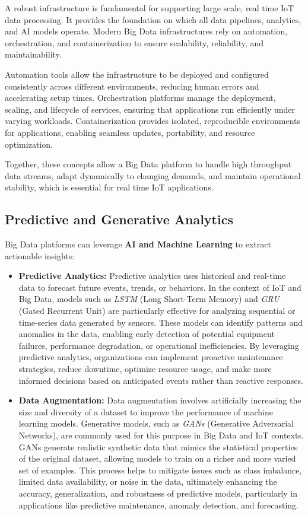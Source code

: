 A robust infrastructure is fundamental for supporting large scale, real time IoT data processing. It provides the foundation on which all data pipelines, analytics, and AI models operate. Modern Big Data infrastructures rely on automation, orchestration, and containerization to ensure scalability, reliability, and maintainability.

Automation tools allow the infrastructure to be deployed and configured consistently across different environments, reducing human errors and accelerating setup times. Orchestration platforms manage the deployment, scaling, and lifecycle of services, ensuring that applications run efficiently under varying workloads. Containerization provides isolated, reproducible environments for applications, enabling seamless updates, portability, and resource optimization.

Together, these concepts allow a Big Data platform to handle high throughput data streams, adapt dynamically to changing demands, and maintain operational stability, which is essential for real time IoT applications.


\subsection{Predictive and Generative Analytics}

Big Data platforms can leverage \textbf{AI and Machine Learning} to extract actionable insights:

\begin{itemize}
     \item \textbf{Predictive Analytics:}  
    Predictive analytics uses historical and real-time data to forecast future events, trends, or behaviors. In the context of IoT and Big Data, models such as \textit{LSTM} (Long Short-Term Memory) and \textit{GRU} (Gated Recurrent Unit) are particularly effective for analyzing sequential or time-series data generated by sensors. These models can identify patterns and anomalies in the data, enabling early detection of potential equipment failures, performance degradation, or operational inefficiencies. By leveraging predictive analytics, organizations can implement proactive maintenance strategies, reduce downtime, optimize resource usage, and make more informed decisions based on anticipated events rather than reactive responses.
    
   \item \textbf{Data Augmentation:}  
    Data augmentation involves artificially increasing the size and diversity of a dataset to improve the performance of machine learning models. Generative models, such as \textit{GANs} (Generative Adversarial Networks), are commonly used for this purpose in Big Data and IoT contexts. GANs generate realistic synthetic data that mimics the statistical properties of the original dataset, allowing models to train on a richer and more varied set of examples. This process helps to mitigate issues such as class imbalance, limited data availability, or noise in the data, ultimately enhancing the accuracy, generalization, and robustness of predictive models, particularly in applications like predictive maintenance, anomaly detection, and forecasting.
\end{itemize}

